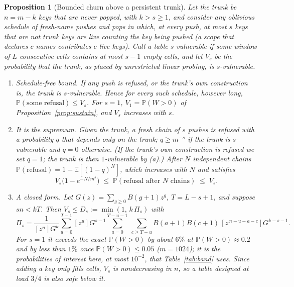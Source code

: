 \documentclass[11pt,a4paper]{article}
\newtheorem{proposition}[theorem]{Proposition}
\theoremstyle{definition}
\theoremstyle{remark}
\newcommand{\Prob}{\mathbb{P}}
\newcommand{\E}{\mathbb{E}}
\begin{document}
\begin{proposition}[Bounded churn above a persistent trunk]\label{prop:band}
Let the \emph{trunk} be $n=m-k$ keys that are never popped, with $k>s\ge1$, and consider any oblivious schedule of fresh-name pushes and pops in which, at every push, at most $s$ keys that are not trunk keys are live \emph{counting the key being pushed} (a scope that declares $c$ names contributes $c$ live keys). Call a table \emph{$s$-vulnerable} if some window of $L$ consecutive cells contains at most $s-1$ empty cells, and let $V_s$ be the probability that the trunk, as placed by unrestricted linear probing, is $s$-vulnerable.
\begin{enumerate}[label=(\alph*),leftmargin=*,itemsep=2pt]
\item \emph{Schedule-free bound.} If any push is refused, or the trunk's own construction is, the trunk is $s$-vulnerable. Hence for every such schedule, however long, $\Prob(\text{some refusal})\le V_s$. For $s=1$, $V_1=\Prob(W>0)$ of Proposition~\ref{prop:sustain}, and $V_s$ increases with $s$.
\item \emph{It is the supremum.} Given the trunk, a fresh chain of $s$ pushes is refused with a probability $q$ that depends only on the trunk; $q\ge m^{-s}$ if the trunk is $s$-vulnerable and $q=0$ otherwise. (If the trunk's own construction is refused we set $q=1$; the trunk is then $1$-vulnerable by (a).) After $N$ independent chains $\Prob(\text{refusal})=1-\E[(1-q)^N]$, which increases with $N$ and satisfies
\[
V_s\bigl(1-e^{-N/m^{s}}\bigr)\;\le\;\Prob(\text{refusal after }N\text{ chains})\;\le\;V_s .
\]
\item \emph{A closed form.} Let $G(z)=\sum_{g\ge0}B(g{+}1)z^g$, $T=L-s+1$, and suppose $sn<kT$. Then $V_s\le D_s:=\min(1,\,k\,\Pi_s)$ with
\[
\Pi_s=\frac{1}{[z^n]G^{k}}\sum_{u=0}^{T-1}[z^u]G^{s-1}\sum_{a=0}^{T-u-1}\ \sum_{c\ge T-u}B(a{+}1)B(c{+}1)\,[z^{\,n-u-a-c}]G^{k-s-1}.
\]
For $s=1$ it exceeds the exact $\Prob(W>0)$ by about $6\%$ at $\Prob(W>0)\approx0.2$ and by less than $1\%$ once $\Prob(W>0)\le0.05$ ($m=1024$); it is the probabilities of interest here, at most $10^{-2}$, that Table~\ref{tab:band} uses. Since adding a key only fills cells, $V_s$ is nondecreasing in $n$, so a table designed at load $3/4$ is also safe below it.
\end{enumerate}
\end{proposition}
\end{document}
